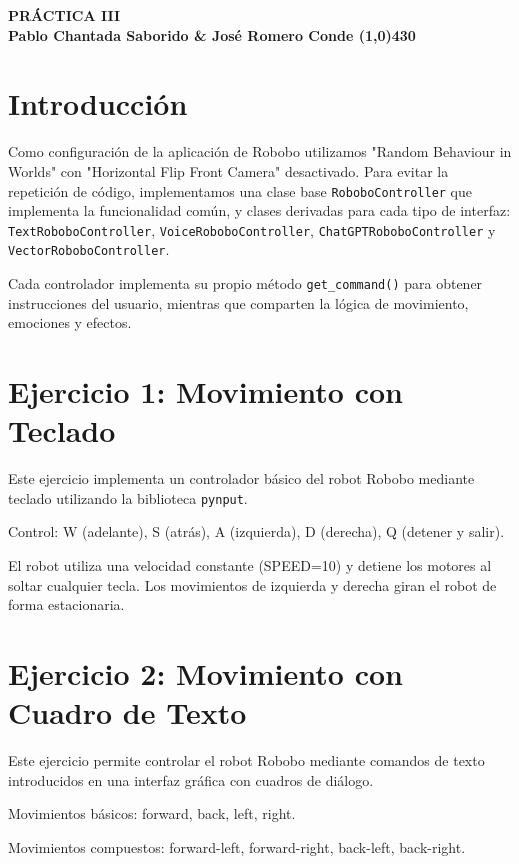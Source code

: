 \documentclass{article}
\begin{document}
\begin{center}
    \LARGE\bfseries PRÁCTICA III\\
    \small Pablo Chantada Saborido \& José Romero Conde
    \line(1,0){430}
\end{center}

\section*{Introducción}

Como configuración de la aplicación de Robobo utilizamos "Random Behaviour in Worlds" con "Horizontal Flip Front Camera" desactivado. Para evitar la repetición de código, implementamos una clase base \texttt{RoboboController} que implementa la funcionalidad común, y clases derivadas para cada tipo de interfaz: \texttt{TextRoboboController}, \texttt{VoiceRoboboController}, \texttt{ChatGPTRoboboController} y \texttt{VectorRoboboController}.

Cada controlador implementa su propio método \texttt{get\_command()} para obtener instrucciones del usuario, mientras que comparten la lógica de movimiento, emociones y efectos.

\section*{Ejercicio 1: Movimiento con Teclado}

Este ejercicio implementa un controlador básico del robot Robobo mediante teclado utilizando la biblioteca \texttt{pynput}.

Control: W (adelante), S (atrás), A (izquierda), D (derecha), Q (detener y salir).

El robot utiliza una velocidad constante (SPEED=10) y detiene los motores al soltar cualquier tecla. Los movimientos de izquierda y derecha giran el robot de forma estacionaria.

\section*{Ejercicio 2: Movimiento con Cuadro de Texto}

Este ejercicio permite controlar el robot Robobo mediante comandos de texto introducidos en una interfaz gráfica con cuadros de diálogo.

Movimientos básicos: forward, back, left, right.

Movimientos compuestos: forward-left, forward-right, back-left, back-right.
\end{document}
